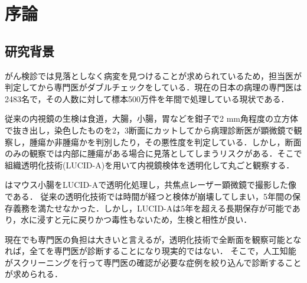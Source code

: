 \chapter{序論}
\label{chap_intro}

\section{研究背景}
がん検診では見落としなく病変を見つけることが求められているため，担当医が判定してから専門医がダブルチェックをしている．現在の日本の病理の専門医は2483名\cite{pathology}で，その人数に対して標本500万件を年間で処理している現状である．

従来の内視鏡の生検は食道，大腸，小腸，胃などを鉗子で2 mm角程度の立方体で抜き出し，染色したものを2，3断面にカットしてから病理診断医が顕微鏡で観察し，腫瘍か非腫瘍かを判別したり，その悪性度を判定している．しかし，断面のみの観察では内部に腫瘍がある場合に見落としてしまうリスクがある．そこで組織透明化技術(LUCID-A)\cite{sekitani2016ultraflexible}を用いて内視鏡検体を透明化して丸ごと観察する．

はマウス小腸をLUCID-Aで透明化処理し，共焦点レーザー顕微鏡で撮影した像である．
従来の透明化技術では時間が経つと検体が崩壊してしまい，5年間の保存義務を満たせなかった．しかし，LUCID-Aは5年を超える長期保存が可能であり，水に浸すと元に戻りかつ毒性もないため，生検と相性が良い．

現在でも専門医の負担は大きいと言えるが，透明化技術で全断面を観察可能となれば，全てを専門医が診断することになり現実的ではない．
そこで，人工知能がスクリーニングを行って専門医の確認が必要な症例を絞り込んで診断することが求められる．

